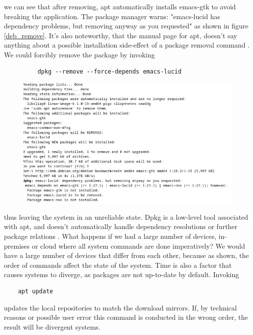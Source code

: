 we can see that after removing, apt automatically installs emacs-gtk to avoid breaking the application. The package manager warns: "emacs-lucid has dependency problems, but removing anyway as you requested" as shown in figure \ref{deb_remove}. It's also noteworthy, that the manual page for apt, doesn't say anything about a possible installation side-effect of a package removal command \cite{ubuntuUbuntuManpage}.
We could forcibly remove the package by invoking
\begin{figure}[H]\label{dpkgsnippet}
\begin{lstlisting} 
    dpkg --remove --force-depends emacs-lucid
\end{lstlisting}
\end{figure}
\begin{figure}\label{deb_remove}
\includegraphics[scale=2.0]{latex/kuvat/cropped_apt_output.jpg}
\label{Terminal output from a Debian system when installing an Emacs package.}
\end{figure}
thus leaving the system in an unreliable state. Dpkg is a low-level tool associated with apt, and doesn't automatically handle dependency resolutions or further package relations \cite{thiruvathukal2004gentoo}. What happens if we had a large number of devices, in-premises or cloud where all system commands are done imperatively? We would have a large number of devices that differ from each other, because as shown, the order of commands affect the state of the system. Time is also a factor that causes systems to diverge, as packages are not up-to-date by default. Invoking \begin{lstlisting}
    apt update
\end{lstlisting}
updates the local repositories to match the download mirrors. If, by technical reasons or possible user error this command is conducted in the wrong order, the result will be divergent systems.

